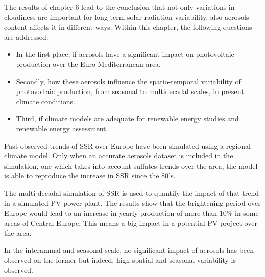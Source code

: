 The results of chapter 6 lead to the conclusion that not only variations in cloudiness are important for long-term solar radiation variability, also aerosols content affects it in different ways. Within this chapter, the following questions are addressed:

\begin{itemize}
  
\item In the first place, if aerosols have a significant impact on photovoltaic production over the Euro-Mediterranean area.
\item Secondly, how these aerosols influence the spatio-temporal variability of photovoltaic production, from seasonal to multidecadal scales, in present climate conditions.
\item Third, if climate models are adequate for renewable energy studies and renewable energy assessment.
\end{itemize}

Past observed trends of SSR over Europe have been simulated using a regional climate model. Only when an accurate aerosols dataset is included in the simulation, one which takes into account sulfates trends over the area, the model is able to reproduce the increase in SSR since the 80's.

The multi-decadal simulation of SSR is used to quantify the impact of that trend in a simulated PV power plant. The results show that the brightening period over Europe would lead to an increase in yearly production of more than 10$\%$ in some areas of Central Europe. This means a big impact in a potential PV project over the area.

In the interannual and seasonal scale, no significant impact of aerosols has been observed on the former but indeed, high spatial and seasonal variability is observed.


